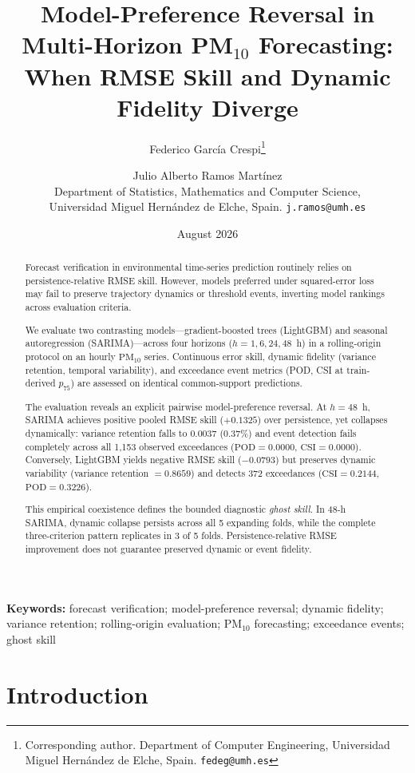\documentclass[12pt]{article}
\title{Model-Preference Reversal in Multi-Horizon PM$_{10}$ Forecasting:\\
When RMSE Skill and Dynamic Fidelity Diverge}
\author{%
  Federico Garc\'ia Crespi\thanks{%
    Corresponding author.
    Department of Computer Engineering,
    Universidad Miguel Hern\'andez de Elche, Spain.
    \texttt{fedeg@umh.es}}
  \and
  Julio Alberto Ramos Mart\'inez\\
  Department of Statistics, Mathematics and Computer Science,\\
  Universidad Miguel Hern\'andez de Elche, Spain.
  \texttt{j.ramos@umh.es}%
}
\date{August 2026}
\providecommand{\keywords}[1]{\par\bigskip\noindent\textbf{Keywords:} #1}
\begin{document}
\maketitle

\begin{abstract}
Forecast verification in environmental time-series prediction routinely relies on persistence-relative RMSE skill. However, models preferred under squared-error loss may fail to preserve trajectory dynamics or threshold events, inverting model rankings across evaluation criteria.

We evaluate two contrasting models---gradient-boosted trees (LightGBM) and seasonal autoregression (SARIMA)---across four horizons ($h = 1, 6, 24, 48$~h) in a rolling-origin protocol on an hourly $\mathrm{PM}_{10}$ series. Continuous error skill, dynamic fidelity (variance retention, temporal variability), and exceedance event metrics (POD, CSI at train-derived $p_{75}$) are assessed on identical common-support predictions.

The evaluation reveals an explicit pairwise model-preference reversal. At $h = 48$~h, SARIMA achieves positive pooled RMSE skill ($+0.1325$) over persistence, yet collapses dynamically: variance retention falls to $0.0037$ ($0.37\%$) and event detection fails completely across all 1,153 observed exceedances ($\mathrm{POD} = 0.0000$, $\mathrm{CSI} = 0.0000$). Conversely, LightGBM yields negative RMSE skill ($-0.0793$) but preserves dynamic variability (variance retention $= 0.8659$) and detects 372 exceedances ($\mathrm{CSI} = 0.2144$, $\mathrm{POD} = 0.3226$).

This empirical coexistence defines the bounded diagnostic \emph{ghost skill}. In 48-h SARIMA, dynamic collapse persists across all 5 expanding folds, while the complete three-criterion pattern replicates in 3 of 5 folds. Persistence-relative RMSE improvement does not guarantee preserved dynamic or event fidelity.
\end{abstract}

\keywords{forecast verification; model-preference reversal; dynamic fidelity;
variance retention; rolling-origin evaluation; PM$_{10}$ forecasting;
exceedance events; ghost skill}

\section{Introduction}
\label{sec:introduction}
\end{document}
